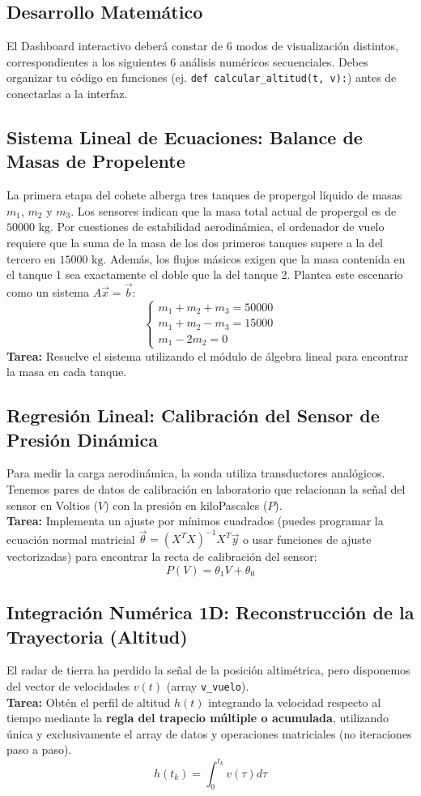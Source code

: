 	\subsection*{Desarrollo Matemático}
	
	El Dashboard interactivo deberá constar de 6 modos de visualización distintos, correspondientes a los siguientes 6 análisis numéricos secuenciales. Debes organizar tu código en funciones (ej. \texttt{def calcular\_altitud(t, v):}) antes de conectarlas a la interfaz.
	
	\subsection*{Sistema Lineal de Ecuaciones: Balance de Masas de Propelente}
	La primera etapa del cohete alberga tres tanques de propergol líquido de masas $m_1$, $m_2$ y $m_3$. Los sensores indican que la masa total actual de propergol es de $50000 \text{ kg}$. Por cuestiones de estabilidad aerodinámica, el ordenador de vuelo requiere que la suma de la masa de los dos primeros tanques supere a la del tercero en $15000 \text{ kg}$. Además, los flujos másicos exigen que la masa contenida en el tanque 1 sea exactamente el doble que la del tanque 2.
	Plantea este escenario como un sistema $A \vec{x} = \vec{b}$:
	\[
	\begin{cases}
		m_1 + m_2 + m_3 = 50000 \\
		m_1 + m_2 - m_3 = 15000 \\
		m_1 - 2 m_2 = 0
	\end{cases}
	\]
	\textbf{Tarea:} Resuelve el sistema utilizando 
	el módulo de álgebra lineal para encontrar la masa en cada tanque.
	
	\subsection*{Regresión Lineal: Calibración del Sensor de Presión Dinámica}
	Para medir la carga aerodinámica, la sonda utiliza transductores analógicos. Tenemos pares de datos de calibración en laboratorio que relacionan la señal del sensor en Voltios ($V$) con la presión en kiloPascales ($P$).\\
	\textbf{Tarea:} Implementa un ajuste por mínimos cuadrados (puedes programar la ecuación normal matricial $\vec{\theta} = (X^T X)^{-1} X^T \vec{y}$ o usar funciones de ajuste vectorizadas) para encontrar la recta de calibración del sensor: 
	\[ P(V) = \theta_1 V + \theta_0 \]
	
	\subsection*{Integración Numérica 1D: Reconstrucción de la Trayectoria (Altitud)}
	El radar de tierra ha perdido la señal de la posición altimétrica, pero disponemos del vector de velocidades $v(t)$ (array \texttt{v\_vuelo}).\\
	\textbf{Tarea:} Obtén el perfil de altitud $h(t)$ integrando la velocidad respecto al tiempo mediante la \textbf{regla del trapecio múltiple o acumulada}, utilizando única y exclusivamente el array de datos y operaciones matriciales (no iteraciones paso a paso).
	\[ h(t_k) = \int_{0}^{t_k} v(\tau) d\tau \]
	
